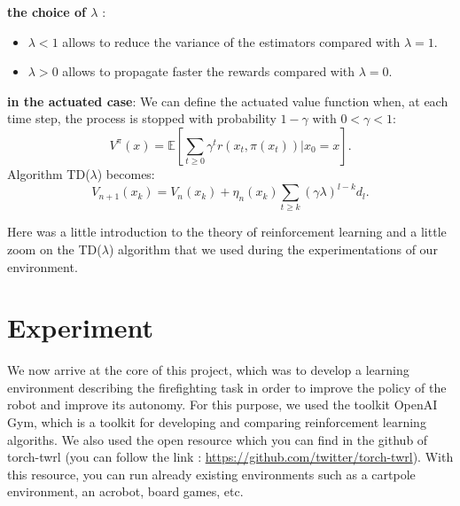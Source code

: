 \documentclass[conference]{IEEEtran}
\begin{document}




\textbf{the choice of $\lambda$} :
\begin{itemize}
 \item $\lambda < 1$ allows to reduce the variance of the estimators compared with $\lambda=1$.
 \item $\lambda > 0$ allows to propagate faster the rewards compared with $\lambda=0$.
\end{itemize}

\textbf{in the actuated case}:
We can define the actuated value function when, at each time step,
the process is stopped with probability $1 - \gamma$ with $0 < \gamma <1$:
\[ V^{\pi}(x) = \mathbb{E} [ \sum_{t \geqslant 0} \gamma^t r(x_t,\pi(x_t))|x_0=x  ]. \]
Algorithm TD($\lambda$) becomes:
\begin{equation*}
V_{n+1}(x_k)=V_n(x_k)+\eta_n(x_k)\sum_{t \geqslant k}(\gamma \lambda)^{l-k}d_l.
\end{equation*}

Here was a little introduction to the theory of reinforcement learning and a little zoom on the TD($\lambda$) algorithm that we used during the experimentations of our environment.

\section{Experiment}

We now arrive at the core of this project, which was to develop a learning environment describing the firefighting task in order to improve the policy of the robot and improve its autonomy. For this purpose, we used the toolkit OpenAI Gym, which is a toolkit for developing and comparing reinforcement learning algoriths. We also used the open resource which you can find in the github of torch-twrl (you can follow the link : \url{https://github.com/twitter/torch-twrl}). With this resource, you can run already existing environments such as a cartpole environment, an acrobot, board games, etc.
\end{document}
